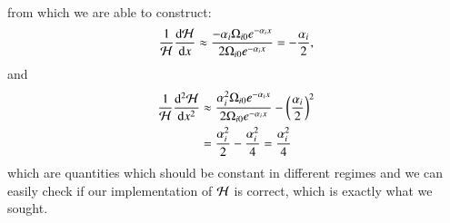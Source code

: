 \begin{tcolorbox}[
        width=1.025\linewidth,
        colback=blue!5!white,
        colframe=white
    ]
\begin{equation*}
\begin{split}
        \end{split}
    \end{equation*}
    from which we are able to construct:
    \begin{equation*}
        \frac{1}{\mathcal{H}}\dv{\mathcal{H}}{x} \approx \frac{-\alpha_i\Omega_{i0}e^{-\alpha_ix}}{2\Omega_{i0}e^{-\alpha_ix}} = -\frac{\alpha_i}{2},
    \end{equation*}
    and
    \begin{equation*}
        \begin{split}
            \frac{1}{\mathcal{H}}\dv[2]{\mathcal{H}}{x} &\approx \frac{\alpha_i^2\Omega_{i0}e^{-\alpha_ix}}{2\Omega_{i0}e^{-\alpha_ix}} - \left(\frac{\alpha_i}{2}\right)^2 \\
            &= \frac{\alpha_i^2}{2} - \frac{\alpha_i^2}{4} = \frac{\alpha_i^2}{4}
        \end{split}
    \end{equation*}
    which are quantities which should be constant in different regimes and we can easily check if our implementation of $\mathcal{H}$ is correct, which is exactly what we sought.
    
    \end{tcolorbox}



